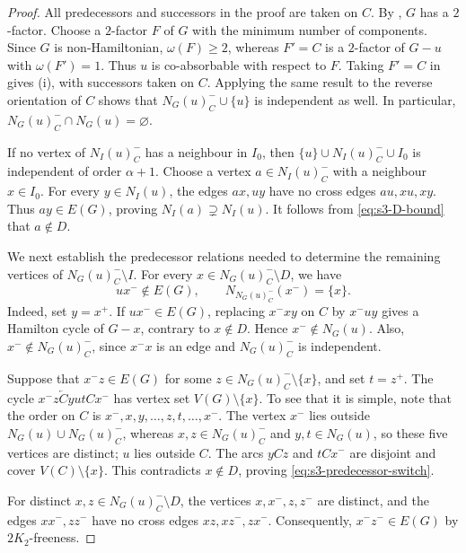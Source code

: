 \documentclass[11pt]{article}
\numberwithin{equation}{section}
\theoremstyle{plain}
\theoremstyle{definition}
\theoremstyle{plain}
\begin{document}
\begin{proof}
All predecessors and successors in the proof are taken on $C$.
By \cite[Proposition~1.6]{OtaSanka2022}, $G$ has a $2$-factor.
Choose a $2$-factor $F$ of $G$ with the minimum number of components.
Since $G$ is non-Hamiltonian, $\omega(F)\geq2$, whereas $F'=C$
is a $2$-factor of $G-u$ with $\omega(F')=1$.
Thus $u$ is co-absorbable with respect to $F$.
Taking $F'=C$ in \cite[Lemma~3.3 and its proof]{OtaSanka2022}
gives \textup{(i)}, with successors taken on $C$.
Applying the same result to the reverse orientation of $C$ shows
that $N_G(u)_C^-\cup\{u\}$ is independent as well. In particular,
$N_G(u)_C^-\cap N_G(u)=\varnothing$.

If no vertex of $N_I(u)_C^-$ has a neighbour in $I_0$, then
$\{u\}\cup N_I(u)_C^-\cup I_0$ is independent of order
$\alpha+1$.
Choose a vertex $a\in N_I(u)_C^-$ with a neighbour $x\in I_0$.
For every $y\in N_I(u)$, the edges $ax,uy$ have no cross edges
$au,xu,xy$.
Thus $ay\in E(G)$, proving $N_I(a)\supsetneq N_I(u)$.
It follows from \eqref{eq:s3-D-bound} that $a\notin D$.

We next establish the predecessor relations needed to determine the
remaining vertices of $N_G(u)_C^-\setminus I$.
For every $x\in N_G(u)_C^-\setminus D$, we have
\begin{equation}\label{eq:s3-predecessor-switch}
    ux^-\notin E(G),\qquad
    N_{N_G(u)_C^-}(x^-)=\{x\}.
\end{equation}
Indeed,   set $y=x^+$.
If $ux^-\in E(G)$, replacing $x^-xy$ on $C$ by $x^-uy$ gives
a Hamilton cycle of $G-x$, contrary to $x\notin D$.
Hence $x^-\notin N_G(u)$.
Also, $x^-\notin N_G(u)_C^-$, since $x^-x$ is an edge and
$N_G(u)_C^-$ is independent.

Suppose that $x^-z\in E(G)$ for some
$z\in N_G(u)_C^-\setminus\{x\}$, and   set $t=z^+$.
The cycle $x^-z\overleftarrow{C}yutCx^-$ has vertex set
$V(G)\setminus\{x\}$.
To see that it is simple, note that the order on $C$ is
$x^-,x,y,\ldots,z,t,\ldots,x^-$.
The vertex $x^-$ lies outside
$N_G(u)\cup N_G(u)_C^-$, whereas
$x,z\in N_G(u)_C^-$ and $y,t\in N_G(u)$, so these five vertices are distinct; $u$ lies outside $C$.
The arcs $yCz$ and $tCx^-$ are disjoint and cover
$V(C)\setminus\{x\}$.
This   contradicts $x\notin D$, proving
\eqref{eq:s3-predecessor-switch}.

For distinct $x,z\in N_G(u)_C^-\setminus D$, the vertices
$x,x^-,z,z^-$ are distinct, and the edges $xx^-,zz^-$ have no
cross edges $xz,xz^-,zx^-$.
Consequently, $x^-z^-\in E(G)$ by $2K_2$-freeness.


\end{proof}
\end{document}
